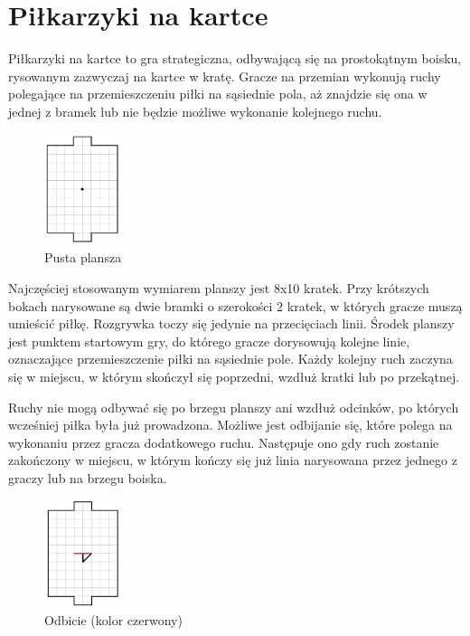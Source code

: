 \documentclass[licencjacka]{pracamgr}
\begin{document}

\section{Piłkarzyki na kartce}

Piłkarzyki na kartce to gra strategiczna, odbywającą się na prostokątnym boisku, rysowanym zazwyczaj na kartce w kratę.
Gracze na przemian wykonują ruchy polegające na przemieszczeniu piłki na sąsiednie pola, aż znajdzie się ona w jednej z bramek lub nie będzie możliwe wykonanie kolejnego ruchu.

\begin{figure}[ht]
  \centering
  \includegraphics[width=0.2\textwidth]{board}
  \caption{Pusta plansza}
\end{figure}

Najczęściej stosowanym wymiarem planszy jest 8x10 kratek.
Przy krótszych bokach narysowane są dwie bramki o szerokości 2 kratek, w których gracze muszą umieścić piłkę.
Rozgrywka toczy się jedynie na przecięciach linii.
Środek planszy jest punktem startowym gry, do którego gracze dorysowują kolejne linie, oznaczające przemieszczenie piłki na sąsiednie pole. Każdy kolejny ruch zaczyna się w miejscu, w którym skończył się poprzedni, wzdłuż kratki lub po przekątnej. 

Ruchy nie mogą odbywać się po brzegu planszy ani wzdłuż odcinków, po których wcześniej piłka była już prowadzona.
Możliwe jest odbijanie się, które polega na wykonaniu przez gracza dodatkowego ruchu. Następuje ono gdy ruch zostanie zakończony w miejscu, w którym kończy się już linia narysowana przez jednego z graczy lub na brzegu boiska. 

\begin{figure}[ht]
  \centering
  \includegraphics[width=0.2\textwidth]{odbicie}
  \caption{Odbicie (kolor czerwony)}
\end{figure}
\end{document}
